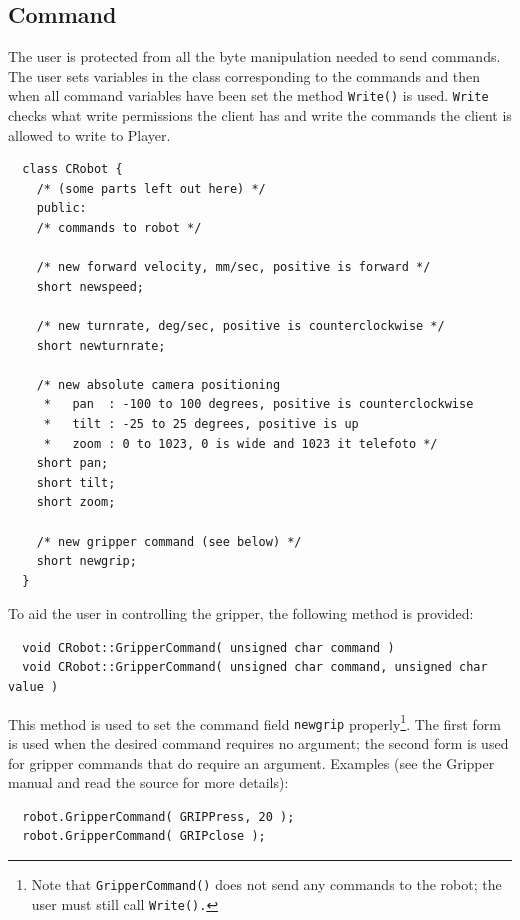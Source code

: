 \documentclass[11pt]{article}
\begin{document}
  
\subsection{Command}

The user is protected from all the byte manipulation needed to send commands.
The user sets variables in the class corresponding to the commands and
then when all command variables have been set the method {\tt Write()} is used. 
{\tt Write} checks what write permissions the client has and write the commands
the client is allowed to write to Player.

\begin{verbatim}
  class CRobot {
    /* (some parts left out here) */
    public:
    /* commands to robot */

    /* new forward velocity, mm/sec, positive is forward */
    short newspeed;

    /* new turnrate, deg/sec, positive is counterclockwise */
    short newturnrate;

    /* new absolute camera positioning
     *   pan  : -100 to 100 degrees, positive is counterclockwise 
     *   tilt : -25 to 25 degrees, positive is up
     *   zoom : 0 to 1023, 0 is wide and 1023 it telefoto */
    short pan;
    short tilt;
    short zoom;

    /* new gripper command (see below) */
    short newgrip;
  }
\end{verbatim}

To aid the user in controlling the gripper, the following method is 
provided:

\begin{verbatim}
  void CRobot::GripperCommand( unsigned char command )
  void CRobot::GripperCommand( unsigned char command, unsigned char value )
\end{verbatim}

This method is used to set the command field {\tt newgrip} 
properly\footnote{Note that {\tt GripperCommand()} does not send
any commands to the robot; the user must still call {\tt Write().}}.  
The first form is used when the desired command requires no argument; 
the second form is used for gripper commands that 
do require an argument.  Examples (see the Gripper manual and read
the source for more details):

\begin{verbatim}
  robot.GripperCommand( GRIPPress, 20 );
  robot.GripperCommand( GRIPclose );
\end{verbatim}
\end{document}

